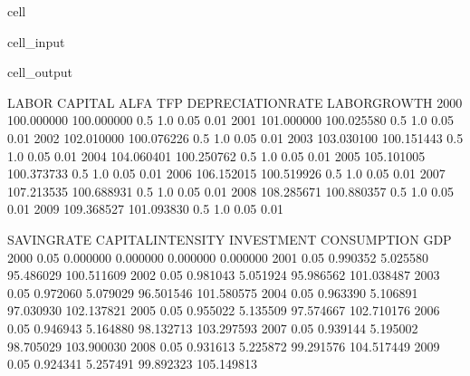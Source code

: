 \documentclass[letterpaper,10pt,english]{jupyterBook}
\begin{document}
\begin{sphinxuseclass}{cell}\begin{sphinxVerbatimInput}

\begin{sphinxuseclass}{cell_input}
\begin{sphinxVerbatim}[commandchars=\\\{\}]
   

\end{sphinxVerbatim}

\end{sphinxuseclass}\end{sphinxVerbatimInput}
\begin{sphinxVerbatimOutput}

\begin{sphinxuseclass}{cell_output}
\begin{sphinxVerbatim}[commandchars=\\\{\}]
           LABOR     CAPITAL  ALFA  TFP  DEPRECIATION\PYGZus{}RATE  LABOR\PYGZus{}GROWTH   
2000  100.000000  100.000000   0.5  1.0               0.05          0.01  \PYGZbs{}
2001  101.000000  100.025580   0.5  1.0               0.05          0.01   
2002  102.010000  100.076226   0.5  1.0               0.05          0.01   
2003  103.030100  100.151443   0.5  1.0               0.05          0.01   
2004  104.060401  100.250762   0.5  1.0               0.05          0.01   
2005  105.101005  100.373733   0.5  1.0               0.05          0.01   
2006  106.152015  100.519926   0.5  1.0               0.05          0.01   
2007  107.213535  100.688931   0.5  1.0               0.05          0.01   
2008  108.285671  100.880357   0.5  1.0               0.05          0.01   
2009  109.368527  101.093830   0.5  1.0               0.05          0.01   

      SAVING\PYGZus{}RATE  CAPITAL\PYGZus{}INTENSITY  INVESTMENT  CONSUMPTION         GDP  
2000         0.05           0.000000    0.000000     0.000000    0.000000  
2001         0.05           0.990352    5.025580    95.486029  100.511609  
2002         0.05           0.981043    5.051924    95.986562  101.038487  
2003         0.05           0.972060    5.079029    96.501546  101.580575  
2004         0.05           0.963390    5.106891    97.030930  102.137821  
2005         0.05           0.955022    5.135509    97.574667  102.710176  
2006         0.05           0.946943    5.164880    98.132713  103.297593  
2007         0.05           0.939144    5.195002    98.705029  103.900030  
2008         0.05           0.931613    5.225872    99.291576  104.517449  
2009         0.05           0.924341    5.257491    99.892323  105.149813  
\end{sphinxVerbatim}

\end{sphinxuseclass}\end{sphinxVerbatimOutput}

\end{sphinxuseclass}
\end{document}
